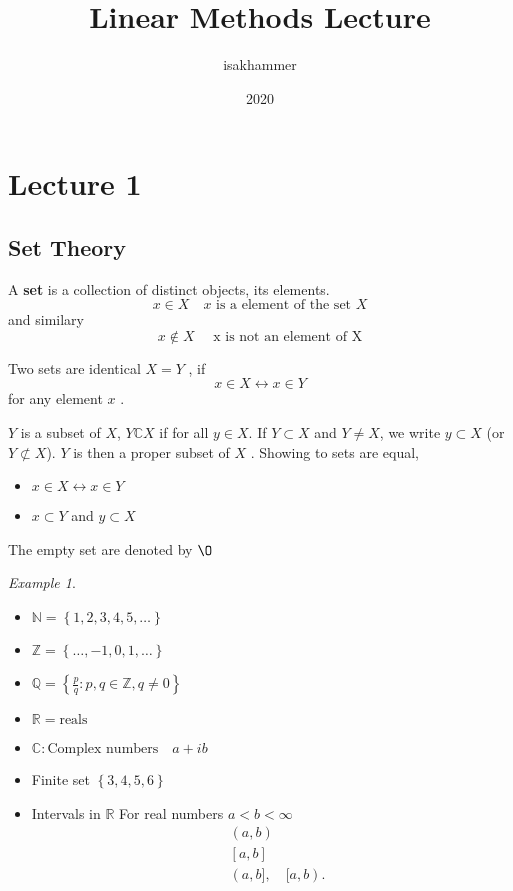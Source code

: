 \documentclass{article}
\title{Linear Methods Lecture}
\author{isakhammer }
\date{2020}
\theoremstyle{remark}
\newtheorem{example}{Example}
\begin{document}
\maketitle
\tableofcontents
\newpage

\newpage
\section{Lecture 1}%
\label{sec:lecture_1}

\subsection{Set Theory}%
\label{sub:set_theory}

\begin{definition}
  A \textbf{set} is a collection of distinct objects, its elements. \[
  x \in X \quad  x \text{ is a element of the set } X 
  \] 
  and similary 
  \[
  x \not\in X \quad  \text{ x is not an element of X} 
  \] 

  \par
   Two sets are identical $X=Y$ , if \[
   x \in X \leftrightarrow x \in Y
   \] 
   for any element  $x$ .
\end{definition}

\begin{definition}
  $Y$ is a subset of $X$, $Y \mathbb{C}  X$ if for all $y \in X$. If $Y \subset X $ and $Y \neq X$, we write $y \subset X$ (or $Y \not \subset X$). $Y$ is then a proper subset of $X$ .
  Showing to sets are equal, 
  \begin{itemize}
    \item $x \in X \leftrightarrow x \in Y$
    \item $x \subset Y$ and $ y \subset X$
  \end{itemize}
  The empty set are denoted by $\O$
\end{definition}

\begin{example}
  \begin{itemize}
    \item $\mathbb{N}  = \left\{ 1,2,3,4,5, \ldots \right\}$
    \item $\mathbb{Z}  = \left\{ \ldots, -1,0,1,\ldots \right\}$
    \item $\mathbb{Q}  = \left\{ \frac{p}{q}: p,q \in \mathbb{Z} , q \neq0 \right\}$ 
    \item $\mathbb{R}  = \text{reals}$ 
    \item $\mathbb{C}: \text{Complex numbers} \quad  a + ib  $ 
    \item Finite set $\left\{ 3,4,5,6 \right\}$ 
    \item Intervals in $\mathbb{R} $ For real numbers $a < b < \infty$
      \begin{align*}
        & (a,b)\\
        & \left[ a,b \right] \\
        & (a,b] , \quad  [a,b) 
      .\end{align*}
  \end{itemize} 
\end{example}
\end{document}
